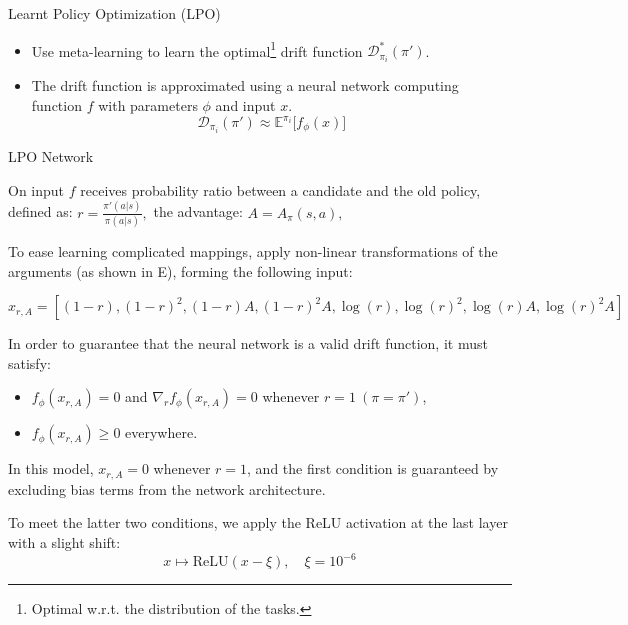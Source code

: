 \documentclass[9pt]{beamer}
\begin{document}
\begin{frame}{Learnt Policy Optimization (LPO)}

\begin{itemize}
    \vspace{1em}  %
  \item Use meta-learning to learn the optimal\footnote{Optimal w.r.t. the distribution of the tasks.} drift function \( \mathcal{D}^*_{\pi_i}(\pi') \).
    \vspace{1em}  %
    \pause
  \item The drift function is approximated using a neural network computing function \( f \) with parameters \( \phi \) and input \( x \).
  \[
    \mathcal{D}_{\pi_i}(\pi') \approx \mathbb{E}^{\pi_i}\big[f_\phi(x)\big]
  \]
  
\end{itemize}

\end{frame}


\begin{frame}{LPO Network}

  On input \(f\) receives probability ratio between a candidate and the old policy, defined as:
  \(
  r = \frac{\pi'(a|s)}{\pi(a|s)},
  \)
  the advantage:
  \(
  A = A_{\pi}(s, a),
  \)

    \vspace{1em}  %
  
  \pause
  
  To ease learning complicated mappings, apply non-linear transformations of the arguments (as shown in E), forming the following input:

  \[
  x_{r, A} = \left[ (1 - r), (1 - r)^2, (1 - r)A, (1 - r)^2 A, \log(r), \log(r)^2, \log(r)A, \log(r)^2 A \right]
  \]

  \pause

  In order to guarantee that the neural network is a valid drift function, it must satisfy:
  \begin{itemize}
    \item \( f_\phi(x_{r,A}) = 0 \) and \( \nabla_r f_\phi(x_{r,A}) = 0 \) whenever \( r = 1\ (\pi=\pi')\),
    \item \( f_\phi(x_{r,A}) \geq 0 \) everywhere.
  \end{itemize}
    \vspace{1em}  %

  \pause

  In this model, \( x_{r,A} = 0 \) whenever \( r = 1 \), and the first condition is guaranteed by excluding bias terms from the network architecture.

  \pause
  
  To meet the latter two conditions, we apply the ReLU activation at the last layer with a slight shift:
  \[
  x \mapsto \text{ReLU}(x - \xi), \quad \xi = 10^{-6}
  \]
\end{frame}
\end{document}
